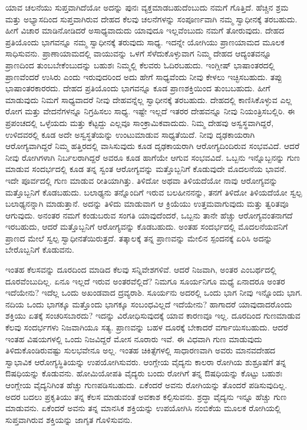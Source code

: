ಯಾವ ಚಲನೆಯು ಸುಪ್ತವಾಗಿದೆಯೋ ಅದನ್ನು ಪುನಃ ವ್ಯಕ್ತಮಾಡಬಹುದೆಂಬುದು ನಮಗೆ ಗೊತ್ತಿದೆ. ಹೆಚ್ಚಿನ ಶ್ರಮ ಮತ್ತು ಅಭ್ಯಾಸದಿಂದ ಸುಪ್ತವಾಗಿರುವ ದೇಹದ ಕೆಲವು ಚಲನೆಗಳನ್ನು ಸಂಪೂರ್ಣವಾಗಿ ನಮ್ಮ ಸ್ವಾಧೀನಕ್ಕೆ ತರಬಹುದು. ಹೀಗೆ ವಿಚಾರ ಮಾಡಿನೋಡಿದರೆ ಅಸಾಧ್ಯವಾದುದು ಯಾವುದೂ ಇಲ್ಲವೆಂಬುದು ನಮಗೆ ತೋರುವುದು. ದೇಹದ ಪ್ರತಿಯೊಂದು ಭಾಗವನ್ನೂ ನಮ್ಮ ಸ್ವಾಧೀನಕ್ಕೆ ತರುವುದು ಸಾಧ್ಯ. ಇದನ್ನೇ ಯೋಗಿಯು ಪ್ರಾಣಯಾಮದ ಮೂಲಕ ಸಾಧಿಸುವನು. ಪ್ರಾಣಾಯಾಮದಲ್ಲಿ ವಾಯುವನ್ನು ಒಳಗೆ ಸೆಳೆದುಕೊಳ್ಳುವಾಗ ನಿಮ್ಮ ದೇಹದ ಆದ್ಯಂತವನ್ನೂ ಪ್ರಾಣದಿಂದ ತುಂಬಬೇಕೆಂಬುದನ್ನು ಬಹುಶಃ ನಿಮ್ಮಲ್ಲಿ ಕೆಲವರು ಓದಿರಬಹುದು. ಇಂಗ್ಲೀಷ್​ ಭಾಷಾಂತರದಲ್ಲಿ ಪ್ರಾಣವೆಂದರೆ ಉಸಿರು ಎಂದು ಇರುವುದರಿಂದ ಅದು ಹೇಗೆ ಸಾಧ್ಯವೆಂದು ನೀವು ಕೇಳಲು ಇಚ್ಛಿಸಬಹುದು. ತಪ್ಪು ಭಾಷಾಂತರಕಾರರದು. ದೇಹದ ಪ್ರತಿಯೊಂದು ಭಾಗವನ್ನೂ ಕೂಡ ಪ್ರಾಣಶಕ್ತಿಯಿಂದ ತುಂಬಬಹುದು. ಹೀಗೆ ಮಾಡುವುದು ನಿಮಗೆ ಸಾಧ್ಯವಾದರೆ ನೀವು ದೇಹವನ್ನೆಲ್ಲ ಸ್ವಾಧೀನಕ್ಕೆ ತರಬಹುದು. ದೇಹದಲ್ಲಿ ಕಾಣಿಸಿಕೊಳ್ಳುವ ಎಲ್ಲ ರೋಗ ಮತ್ತು ವೇದನೆಗಳನ್ನೂ ನಿಗ್ರಹಿಸಲು ಸಾಧ್ಯ. ಇಷ್ಟೇ ಇಲ್ಲದೆ ಇತರರ ದೇಹವನ್ನೂ ನೀವು ನಿಯಂತ್ರಿಸಬಲ್ಲಿರಿ. ಈ ಪ್ರಪಂಚದಲ್ಲಿ ಒಳ್ಳೆಯದು ಮತ್ತು ಕೆಟ್ಟದ್ದು ಎಲ್ಲವೂ ಸಾಂಕ್ರಾಮಿಕವಾದುದು. ನಿಮ್ಮ ದೇಹವು ಅಸ್ವಸ್ಥವಾಗಿದ್ದರೆ, ಉಳಿದವರಲ್ಲಿ ಕೂಡ ಅದೇ ಅಸ್ವಸ್ಥತೆಯನ್ನು ಉಂಟುಮಾಡುವ ಸಾಧ್ಯತೆಯಿದೆ. ನೀವು ದೃಢಕಾಯರಾಗಿ ಆರೋಗ್ಯವಾಗಿದ್ದರೆ ನಿಮ್ಮ ಹತ್ತಿರದಲ್ಲಿ ವಾಸಿಸುವುದು ಕೂಡ ದೃಢಕಾಯರಾಗಿ ಆರೋಗ್ಯದಿಂದಿರುವ ಸಂಭವವಿದೆ. ಆದರೆ ನೀವು ರೋಗಿಗಳಾಗಿ ನಿರ್ಬಲರಾಗಿದ್ದರೆ ಅವರೂ ಕೂಡ ಹಾಗೆಯೇ ಆಗುವ ಸಂಭವವಿದೆ. ಒಬ್ಬನು ಇನ್ನೊಬ್ಬನನ್ನು ಗುಣ ಮಾಡುವ ಸಂದರ್ಭದಲ್ಲಿ ಕೂಡ ತನ್ನ ಸ್ವಂತ ಆರೋಗ್ಯವನ್ನು ಮತ್ತೊಬ್ಬನಿಗೆ ಕೊಡುವುದೇ ಮೊದಲನೆಯ ಭಾವನೆ. ಇದೇ ಪೂರ್ವದಲ್ಲಿ ಗುಣ ಮಾಡುವ ರೀತಿಯಾಗಿತ್ತು. ತಿಳಿದೋ ಅಥವಾ ತಿಳಿಯದೆಯೋ ನಾವು ಆರೋಗ್ಯವನ್ನು ಮತ್ತೊಬ್ಬನಿಗೆ ಕೊಡಬಹುದು. ಬಲಾಢ್ಯನು ತನ್ನೊಂದಿಗೆ ಇರುವ ಬಲಹೀನನನ್ನು, ತನಗೆ ತಿಳಿದೋ ತಿಳಿಯದೆಯೋ ಸ್ವಲ್ಪ ಬಲಾಢ್ಯನನ್ನಾಗಿ ಮಾಡುತ್ತಾನೆ. ಅದನ್ನು ತಿಳಿದು ಮಾಡುವಾಗ ಆ ಕ್ರಿಯೆಯು ಉತ್ತಮವಾಗುವುದು ಮತ್ತು ತ್ವರಿತವೂ ಆಗುವುದು. ಅನಂತರ ನಮಗೆ ಕಂಡುಬರುವ ಸಂಗತಿ ಯಾವುದೆಂದರೆ, ಒಬ್ಬನು ತಾನೇ ಹೆಚ್ಚು ಆರೋಗ್ಯವಂತನಾಗದೆ ಇರಬಹುದು, ಆದರೆ ಮತ್ತೊಬ್ಬನಿಗೆ ಆರೋಗ್ಯವನ್ನು ಕೊಡಬಹುದು. ಅಂತಹ ಸಂದರ್ಭದಲ್ಲಿ ಮೊದಲನೆಯವನಿಗೆ ಪ್ರಾಣದ ಮೇಲೆ ಸ್ವಲ್ಪ ಸ್ವಾಧೀನತೆಯಿರುತ್ತದೆ. ತತ್ಕಾಲಕ್ಕೆ ತನ್ನ ಪ್ರಾಣವನ್ನು ಮೇಲಿನ ಸ್ಪಂದನಕ್ಕೆ ಏರಿಸಿ ಅದನ್ನು ಬೇರೊಬ್ಬನಿಗೆ ಕೊಡುವನು. 


ಇಂತಹ ಕೆಲಸವನ್ನು ದೂರದಿಂದ ಮಾಡಿದ ಕೆಲವು ಸನ್ನಿವೇಶಗಳಿವೆ. ಆದರೆ ನಿಜವಾಗಿ, ಅಂತರ ಎಂಬರ್ಥದಲ್ಲಿ ದೂರವೆಂಬುದಿಲ್ಲ. ಏನೂ ಇಲ್ಲದೆ ಇರುವ ಅಂತರವೆಲ್ಲಿದೆ? ನಿಮಗೂ ಸೂರ್ಯನಿಗೂ ಮಧ್ಯೆ ಏನಾದರೂ ಅಂತರ ಇದೆಯೇನು? ಇದೆಲ್ಲ ಒಂದು ಅಖಂಡವಾದ ದ್ರವ್ಯರಾಶಿ. ಸೂರ್ಯನು ಅದರಲ್ಲಿ ಒಂದು ಭಾಗ ನೀವು ಇನ್ನೊಂದು ಭಾಗ. ನದಿಯ ಒಂದು ಭಾಗಕ್ಕೂ ಮತ್ತೊಂದು ಭಾಗಕ್ಕೂ ಸಂಬಂಧವಿಲ್ಲದೆ ಇದೆಯೇನು? ಹಾಗಾದರೆ ಯಾವುದಾದರೊಂದು ಶಕ್ತಿಯು ಏತಕ್ಕೆ ಸಂಚರಿಸಬಾರದು? ಇದನ್ನು ವಿರೋಧಿಸುವುದಕ್ಕೆ ಯಾವ ಕಾರಣವೂ ಇಲ್ಲ. ದೂರದಿಂದ ಗುಣಮಾಡುವ ಕೆಲವು ಸಂದರ್ಭಗಳು ನಿಜವಾಗಿಯೂ ಸತ್ಯ. ಪ್ರಾಣವನ್ನು ಬಹಳ ದೂರಕ್ಕೆ ಬೇಕಾದರೆ ವರ್ಗಾಯಿಸಬಹುದು. ಆದರೆ ಇಂತಹ ವಿಷಯಗಳಲ್ಲಿ ಒಂದು ನಿಜವಿದ್ದರೆ ಮೋಸ ನೂರಾರು ಇವೆ. ಈ ವಿಧವಾಗಿ ಗುಣ ಮಾಡುವುದು ತಿಳಿದುಕೊಂಡಿರುವಷ್ಟು ಸುಲಭವೇನೂ ಅಲ್ಲ. ಇಂತಹ ಚಿಕಿತ್ಸೆಗಳಲ್ಲಿ ಸಾಧಾರಣವಾಗಿ ಅವರು ಮಾನವದೇಹದ ಸ್ವಾಭಾವಿಕ ಆರೋಗ್ಯಸ್ಥಿತಿಯನ್ನು ಉಪಯೋಗಿಸುವರು. ಆಂಗ್ಲೇಯ ವೈದ್ಯನು ಕಾಲರಾ ರೋಗಿಯ ಶುಶ್ರೂಷೆಗೆ ತನ್ನ ಔಷಧಿಯನ್ನು ಕೊಡುವನು. ಹೋಮಿಯೋಪತಿ ವೈದ್ಯರು ಬಂದು ರೋಗಿಗೆ ತನ್ನ ಔಷಧಿಯನ್ನು ಕೊಟ್ಟು ಬಹುಶಃ ಆಂಗ್ಲೇಯ ವೈದ್ಯನಿಗಿಂತ ಹೆಚ್ಚು ಗುಣಪಡಿಸಬಹುದು. ಏಕೆಂದರೆ ಅವನು ರೋಗಿಯನ್ನು ತೊಂದರೆ ಪಡಿಸುವುದಿಲ್ಲ. ಅದರ ಬದಲು ಪ್ರಕೃತಿಯು ತನ್ನ ಕೆಲಸ ಮಾಡುವಂತೆ ಅವಕಾಶ ಕಲ್ಪಿಸುವನು. ಶ್ರದ್ಧಾ ವೈದ್ಯನು ಇನ್ನೂ ಹೆಚ್ಚು ಗುಣ ಮಾಡುವನು. ಏಕೆಂದರೆ ಅವನು ತನ್ನ ಮಾನಸಿಕ ಶಕ್ತಿಯನ್ನು ಉಪಯೋಗಿಸಿ ನಂಬಿಕೆಯ ಮೂಲಕ ರೋಗಿಯಲ್ಲಿ ಸುಪ್ತವಾಗಿರುವ ಶಕ್ತಿಯನ್ನು ಜಾಗೃತ ಗೊಳಿಸುವನು. 



